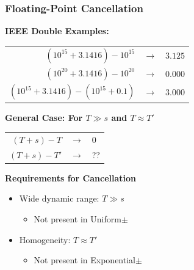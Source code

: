 \documentclass[t,pdf]{beamer}
\newcommand{\bitem}{\item[$\bullet$]}
\begin{document}
\begin{frame}
  \frametitle{Floating-Point Cancellation}

\medskip
\textbf{IEEE Double Examples:}

\smallskip

  \begin{tabular}{rcl}
    $(10^{15} + 3.1416) - 10^{15}$ & $\longrightarrow$ & $3.125$ \\[0.5em]
    $(10^{20} + 3.1416) - 10^{20}$ & $\longrightarrow$ & $0.000$ \\[0.5em]
    $(10^{15} + 3.1416) - (10^{15} + 0.1)$ & $\longrightarrow$ & $3.000$ \\[0.5em]
  \end{tabular}

\medskip

\textbf{General Case: For $T \gg s$ and $T \approx T'$}

\medskip

  \begin{tabular}{rcl}
    $(T + s) - T$ & $\longrightarrow$ & $0$ \\[0.5em]
    $(T + s) - T'$ & $\longrightarrow$ & ?? \\
  \end{tabular}

  \medskip

  \textbf{Requirements for Cancellation}

\smallskip

  \begin{itemize}
  \item Wide dynamic range: $T \gg s$
    \begin{itemize}
      \bitem Not present in Uniform$\pm$
    \end{itemize}
  \item Homogeneity: $T \approx T'$
    \begin{itemize}
      \bitem Not present in Exponential$\pm$
    \end{itemize}

  \end{itemize}

\end{frame}
\end{document}
